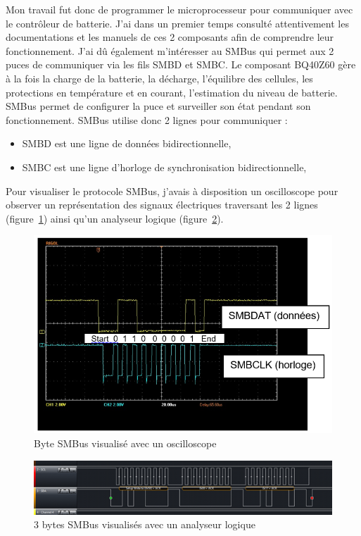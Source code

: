 \documentclass[a4paper, 12pt, sffamily]{report}
\begin{document}
Mon travail fut donc de programmer le microprocesseur pour communiquer avec le contrôleur de batterie. J’ai dans un premier temps consulté attentivement les documentations et les manuels de ces 2 composants afin de comprendre leur fonctionnement. J’ai dû également m’intéresser au SMBus 
qui permet aux 2 puces de communiquer via les fils SMBD et SMBC.
Le composant BQ40Z60 gère à la fois la charge de la batterie, la décharge, l’équilibre des cellules, les protections en température et en courant, l’estimation du niveau de batterie. SMBus permet de configurer la puce et surveiller son état pendant son fonctionnement.
SMBus utilise donc 2 lignes pour communiquer :
\begin{itemize} %
\item SMBD est une ligne de données bidirectionnelle,
\item SMBC est une ligne d'horloge de synchronisation bidirectionnelle,
\end{itemize}

Pour visualiser le protocole SMBus, j’avais à disposition un oscilloscope pour observer un représentation des signaux électriques traversant les 2 lignes (figure~\ref{fig:SMBus_oscilloscope}) ainsi qu’un analyseur logique (figure~\ref{fig:SMBus_logic_analyser}).

\begin{figure}[H]
\centering
\includegraphics[scale=0.6]{figures/screenshots/SMBus_oscilloscope.png}
\caption{Byte SMBus visualisé avec un oscilloscope}
\label{fig:SMBus_oscilloscope}
\end{figure}

\begin{figure}[H]
\centering
\includegraphics[scale=0.9]{figures/screenshots/SMBus_logic_analyser.png}
\caption{3 bytes SMBus visualisés avec un analyseur logique}
\label{fig:SMBus_logic_analyser}
\end{figure}
\end{document}
